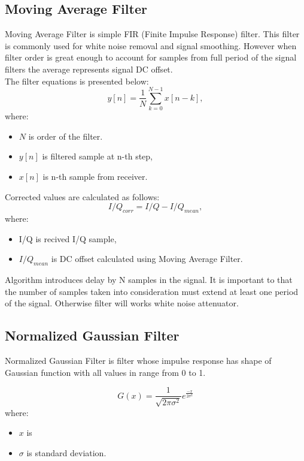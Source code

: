 \documentclass[en,printmode]{mgr}
\begin{document}
		\subsection*{Moving Average Filter}
			Moving Average Filter is simple FIR (Finite Impulse Response) filter. This filter is
			commonly used for white noise removal and signal smoothing. However when filter order
			is great enough to account for samples from full period of the signal filters the
			average represents signal DC offset.
			\\
			
			
			The filter equations is presented below:
			\begin{equation}
				y[n] = \frac{1}{N} \sum_{k=0}^{N-1}x[n-k], \label{eq:mva_fir}
			\end{equation}
			where:
			\begin{itemize}
				\item   $N$ is order of the filter.
				\item	$y[n]$ is filtered sample at n-th step,
				\item   $x[n]$ is n-th sample from receiver.
			\end{itemize}
			Corrected values are calculated as follows:
			\[
				I/Q_{corr} = I/Q - I/Q_{mean},
			\]
			where:
			\begin{itemize}
				\item I/Q is recived I/Q sample,
				\item $I/Q_{mean}$ is DC offset calculated using Moving Average Filter.
			\end{itemize}
			\vspace{1cm}
			
			Algorithm introduces delay by N samples in the signal. It is important to that the number of
			samples taken into consideration must extend at least one period of the signal. Otherwise
			filter will works white noise attenuator.
		\subsection*{Normalized Gaussian Filter}
			Normalized Gaussian Filter is filter whose impulse response has shape of Gaussian
			function with all values in range from 0 to 1.
			
			\[
				G(x) = \frac{1}{ \sqrt{2\pi \sigma^2}}e^{\frac{-x}{2\sigma^2}}
			\]
			where:
			\begin{itemize}
				\item $x$ is 
				\item $\sigma$ is standard deviation. 
			\end{itemize}
			
\end{document}
